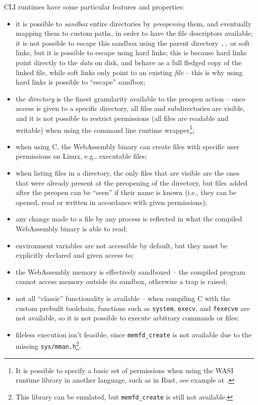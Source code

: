 CLI runtimes have some particular features and properties:
\begin{itemize}
  \item it is possible to \textit{sandbox} entire directories by \textit{preopening} them, and eventually mapping them to custom paths,
        in order to have the file descriptors available; it is not possible to escape this sandbox using the parent directory \texttt{..}
        or soft links, but it is possible to escape using hard links;
        this is because hard links point directly to the \textit{data} on disk, and behave as a full fledged copy of the linked file, while soft links
        only point to an existing \textit{file} -- this is why using hard links is possible to ``escape'' sandbox;
  \item the \textit{directory} is the finest granularity available to the preopen action -- once access is given to a specific directory, all files and subdirectories are
        visible, and it is not possible to restrict permissions (all files are readable and
        writable) when using the command line runtime wrapper\footnote{It is possible to specify a basic set of permissions when using the WASI runtime library in another language, such as in Rust,
        see example at \cite{wasi-state-example}.};
  \item when using C, the WebAssembly binary can create files with specific user permissions on Linux, e.g., executable files;
  \item when listing files in a directory, the only files that are visible are the ones that were already present at the preopening of the directory,
        but files added after the preopen can be ``seen'' if their name is known (i.e., they can be opened, read or written in accordance with given permissions);
  \item any change made to a file by any process is reflected in what the compiled WebAssembly binary is able to read;
  \item environment variables are not accessible by default, but they must be explicitly declared and given access to;
  \item the WebAssembly memory is effectively sandboxed -- the compiled program cannot access memory outside its sandbox, otherwise a trap is raised;
  \item not all ``classic'' functionality is available -- when compiling C with the custom prebuilt toolchain,
        functions such as \texttt{system}, \texttt{execv}, and \texttt{fexecve} are not available,
        so it is not possible to execute arbitrary commands or files;
  \item fileless execution isn't feasible, since \texttt{memfd\_create} is not available due to the missing
        \texttt{sys/mman.h}\footnote{This library can be emulated, but \texttt{memfd\_create} is still not available.}.
\end{itemize}

